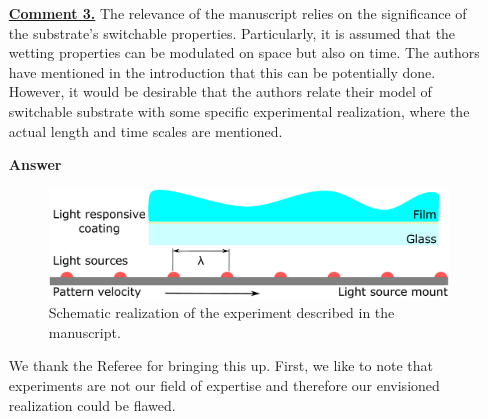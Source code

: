 \documentclass[12pt,english]{article}
\begin{document}
\begin{itemize}
{discriminating parameter (see figure \ref{fig:q2smallslip}).
\begin{figure}
    \centering
    \caption{}
    \label{fig:q2smallslip}
\end{figure}
We have commented on this when we give the value of the slip length, just before 
equation (5) of the revised manuscript.
}

\item[ \textbf{\underline{Comment 3.}}]
{
The relevance of the manuscript relies on the significance of the substrate's switchable properties. 
Particularly, it is assumed that the wetting properties can be modulated on space but also on time. 
The authors have mentioned in the introduction that this can be potentially done. 
However, it would be desirable that the authors relate their model of switchable substrate with some specific experimental realization, where the actual length and time scales are mentioned.
}

\item[ \textbf{{Answer}}]
{
\begin{figure}
    \centering
    \includegraphics[width=\textwidth]{simple_exp.pdf}
    \caption{Schematic realization of the experiment described in the manuscript.}
    \label{fig:experiment_illustration}
\end{figure}
We thank the Referee for bringing this up.
First, we like to note that experiments are not our field of expertise and therefore our envisioned realization could be flawed.

}
\end{itemize}
\end{document}
